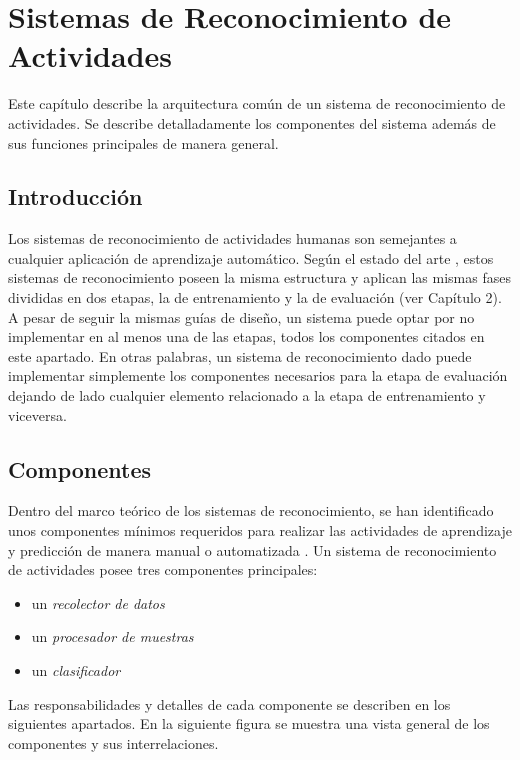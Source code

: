 
\chapter{Sistemas de Reconocimiento de Actividades }

\label{chap:sistemas-de-reconocimiento}

Este capítulo describe la arquitectura común de un sistema de reconocimiento
de actividades. Se describe detalladamente los componentes del sistema
además de sus funciones principales de manera general. 

\section{Introducción}

Los sistemas de reconocimiento de actividades humanas son semejantes
a cualquier aplicación de aprendizaje automático. Según el estado
del arte \cite{LaraLabrador2013}, estos sistemas de reconocimiento
poseen la misma estructura y aplican las mismas fases divididas en
dos etapas, la de entrenamiento y la de evaluación (ver Capítulo 2).
A pesar de seguir la mismas guías de diseño, un sistema puede optar
por no implementar en al menos una de las etapas, todos los componentes
citados en este apartado. En otras palabras, un sistema de reconocimiento
dado puede implementar simplemente los componentes necesarios para
la etapa de evaluación dejando de lado cualquier elemento relacionado
a la etapa de entrenamiento y viceversa. 

\section{Componentes}

Dentro del marco teórico de los sistemas de reconocimiento, se han
identificado unos componentes mínimos requeridos para realizar las
actividades de aprendizaje y predicción de manera manual o automatizada
\cite{Choudhury2008}. Un sistema de reconocimiento de actividades
posee tres componentes principales:
\begin{itemize}
\item un \emph{recolector de datos}
\item un\emph{ procesador de muestras} 
\item un \emph{clasificador }
\end{itemize}
Las responsabilidades y detalles de cada componente se describen en
los siguientes apartados. En la siguiente figura se muestra una vista
general de los componentes y sus interrelaciones.

